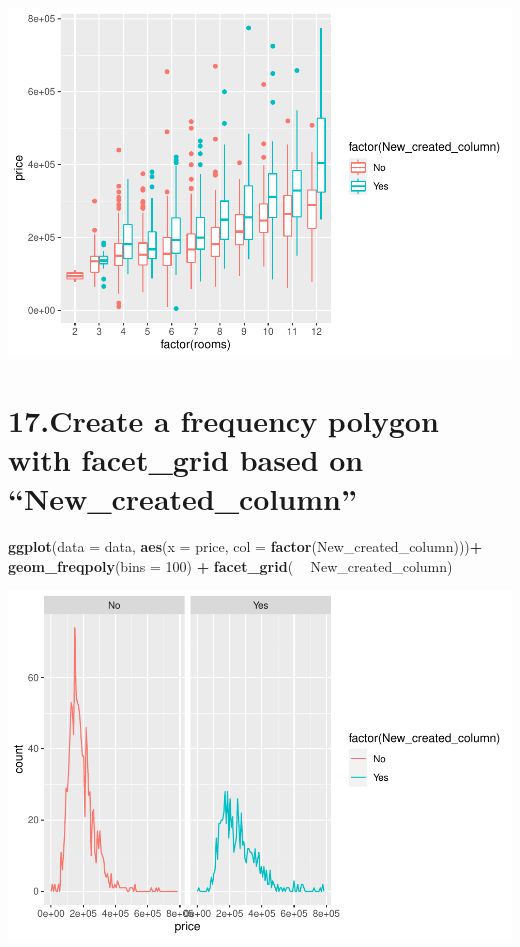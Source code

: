 \documentclass[]{article}
\newenvironment{Shaded}{\begin{snugshade}}{\end{snugshade}}
\newcommand{\DataTypeTok}[1]{\textcolor[rgb]{0.13,0.29,0.53}{#1}}
\newcommand{\DecValTok}[1]{\textcolor[rgb]{0.00,0.00,0.81}{#1}}
\newcommand{\KeywordTok}[1]{\textcolor[rgb]{0.13,0.29,0.53}{\textbf{#1}}}
\newcommand{\NormalTok}[1]{#1}
\newcommand{\OperatorTok}[1]{\textcolor[rgb]{0.81,0.36,0.00}{\textbf{#1}}}
\newcommand{\StringTok}[1]{\textcolor[rgb]{0.31,0.60,0.02}{#1}}
\begin{document}
\includegraphics{Day_5_files/figure-latex/unnamed-chunk-17-1.pdf}

\hypertarget{create-a-frequency-polygon-with-facet_grid-based-on-new_created_column}{%
\section{17.Create a frequency polygon with facet\_grid based on
``New\_created\_column''}\label{create-a-frequency-polygon-with-facet_grid-based-on-new_created_column}}

\begin{Shaded}
\begin{Highlighting}[]
\KeywordTok{ggplot}\NormalTok{(}\DataTypeTok{data =}\NormalTok{ data, }\KeywordTok{aes}\NormalTok{(}\DataTypeTok{x =}\NormalTok{ price, }
                             \DataTypeTok{col =} \KeywordTok{factor}\NormalTok{(New_created_column)))}\OperatorTok{+}\StringTok{ }
\StringTok{  }\KeywordTok{geom_freqpoly}\NormalTok{(}\DataTypeTok{bins =} \DecValTok{100}\NormalTok{) }\OperatorTok{+}
\StringTok{  }\KeywordTok{facet_grid}\NormalTok{( }\OperatorTok{~}\StringTok{ }\NormalTok{New_created_column)}
\end{Highlighting}
\end{Shaded}

\includegraphics{Day_5_files/figure-latex/unnamed-chunk-18-1.pdf}
\end{document}
